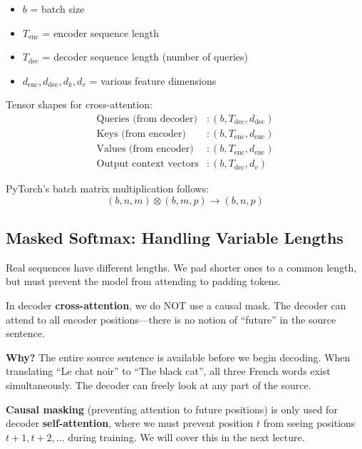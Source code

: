\documentclass{article}
\begin{document}
\begin{tcolorbox}[colback=yellow!5!white, colframe=orange!50!black, title=Batch Dimensions]
\begin{itemize}
    \item $b$ = batch size
    \item $T_{\text{enc}}$ = encoder sequence length
    \item $T_{\text{dec}}$ = decoder sequence length (number of queries)
    \item $d_{\text{enc}}, d_{\text{dec}}, d_k, d_v$ = various feature dimensions
\end{itemize}

Tensor shapes for cross-attention:
\begin{align}
\text{Queries (from decoder)} &: (b, T_{\text{dec}}, d_{\text{dec}}) \\
\text{Keys (from encoder)} &: (b, T_{\text{enc}}, d_{\text{enc}}) \\
\text{Values (from encoder)} &: (b, T_{\text{enc}}, d_{\text{enc}}) \\
\text{Output context vectors} &: (b, T_{\text{dec}}, d_v)
\end{align}
\end{tcolorbox}

PyTorch's batch matrix multiplication follows:
\begin{equation}
(b, n, m) \otimes (b, m, p) \rightarrow (b, n, p)
\end{equation}

\subsection{Masked Softmax: Handling Variable Lengths}

Real sequences have different lengths. We pad shorter ones to a common length, but must prevent the model from attending to padding tokens.


\begin{tcolorbox}[colback=red!5!white, colframe=red!50!black, title=Important: No Causal Mask in Cross-Attention]
In decoder \textbf{cross-attention}, we do NOT use a causal mask. The decoder can attend to all encoder positions---there is no notion of ``future'' in the source sentence.

\textbf{Why?} The entire source sentence is available before we begin decoding. When translating ``Le chat noir'' to ``The black cat'', all three French words exist simultaneously. The decoder can freely look at any part of the source.

\textbf{Causal masking} (preventing attention to future positions) is only used for decoder \textbf{self-attention}, where we must prevent position $t$ from seeing positions $t+1, t+2, \ldots$ during training. We will cover this in the next lecture.
\end{tcolorbox}
\end{document}
